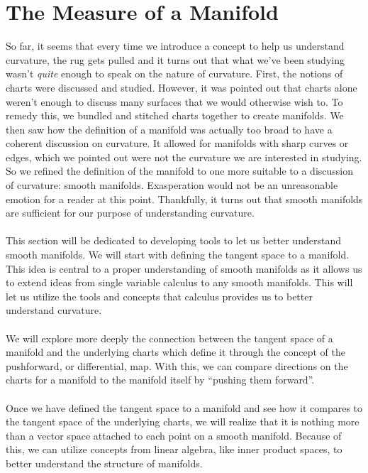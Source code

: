 \documentclass[]{article}
\newcommand\<{\ensuremath{\left\langle}}
\renewcommand\>{\ensuremath{\right\rangle}}
\theoremstyle{definition}
\theoremstyle{definition}
\begin{document}
	
	
	
	\newpage
	\section{The Measure of a Manifold}
	So far, it seems that every time we introduce a concept to help us understand curvature, the rug gets pulled and it turns out that what we've been studying wasn't \textit{quite} enough to speak on the nature of curvature. First, the notions of charts were discussed and studied. However, it was pointed out that charts alone weren't enough to discuss many surfaces that we would otherwise wish to. To remedy this, we bundled and stitched charts together to create manifolds. We then saw how the definition of a manifold was actually too broad to have a coherent discussion on curvature. It allowed for manifolds with sharp curves or edges, which we pointed out were not the curvature we are interested in studying. So we refined the definition of the manifold to one more suitable to a discussion of curvature: smooth manifolds. Exasperation would not be an unreasonable emotion for a reader at this point. Thankfully, it turns out that smooth manifolds are sufficient for our purpose of understanding curvature.\\
	\\
	This section will be dedicated to developing tools to let us better understand smooth manifolds. We will start with defining the tangent space to a manifold. This idea is central to a proper understanding of smooth manifolds as it allows us to extend ideas from single variable calculus to any smooth manifolds. This will let us utilize the tools and concepts that calculus provides us to better understand curvature.\\
	\\
	We will explore more deeply the connection between the tangent space of a manifold and the underlying charts which define it through the concept of the pushforward, or differential, map. With this, we can compare directions on the charts for a manifold to the manifold itself by ``pushing them forward''. \\
	\\
	Once we have defined the tangent space to a manifold and see how it compares to the tangent space of the underlying charts, we will realize that it is nothing more than a vector space attached to each point on a smooth manifold. Because of this, we can utilize concepts from linear algebra, like inner product spaces, to better understand the structure of manifolds.
	
\end{document}
